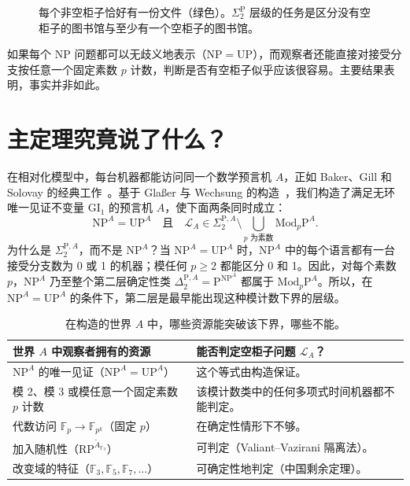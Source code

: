 \documentclass[11pt,a4paper]{article}
\newcommand{\F}{\mathbb F}
\newcommand{\NP}{\mathrm{NP}}
\newcommand{\UP}{\mathrm{UP}}
\newcommand{\MP}[1]{\mathrm{Mod}_{#1}\mathrm P}
\newcommand{\LA}{\mathcal L_A}
\newcommand{\GI}{\mathrm{GI}_1}
\newcommand{\Sig}{\Sigma_2^{\mathrm P,A}}
\begin{document}
\begin{figure}[htbp]\centering
{}
\caption{每个非空柜子恰好有一份文件（绿色）。$\Sigma_2^{\mathrm P}$ 层级的任务是区分没有空柜子的图书馆与至少有一个空柜子的图书馆。}
\end{figure}

如果每个 $\NP$ 问题都可以无歧义地表示（$\NP=\UP$），而观察者还能直接对接受分支按任意一个固定素数 $p$ 计数，判断是否有空柜子似乎应该很容易。主要结果表明，事实并非如此。

\section{主定理究竟说了什么？}
在相对化模型中，每台机器都能访问同一个数学预言机 $A$，正如 Baker、Gill 和 Solovay 的经典工作~\cite{bgs}。基于 Glaßer 与 Wechsung 的构造~\cite{gw}，我们构造了满足无环唯一见证不变量 $\GI$ 的预言机 $A$，使下面两条同时成立：
\[
 \NP^A=\UP^A\quad\text{且}\quad
 \LA\in\Sig\setminus\bigcup_{p\text{ 为素数}}\MP p^A .
\]
为什么是 $\Sig$，而不是 $\NP^A$？当 $\NP^A=\UP^A$ 时，$\NP^A$ 中的每个语言都有一台接受分支数为 0 或 1 的机器；模任何 $p\ge2$ 都能区分 0 和 1。因此，对每个素数 $p$，$\NP^A$ 乃至整个第二层确定性类 $\Delta_2^{\mathrm P,A}=\mathrm P^{\NP^A}$ 都属于 $\MP p^A$。所以，在 $\NP^A=\UP^A$ 的条件下，第二层是最早能出现这种模计数下界的层级。

\begin{table}[htbp]\small\centering
\begin{tabularx}{\linewidth}{@{}>{\raggedright\arraybackslash}p{.47\linewidth} >{\raggedright\arraybackslash}X@{}}
\toprule 世界 $A$ 中观察者拥有的资源 & 能否判定空柜子问题 $\LA$？\\
\midrule $\NP^A$ 的唯一见证（$\NP^A=\UP^A$） & 这个等式由构造保证。\\
模 2、模 3 或模任意一个固定素数 $p$ 计数 & 该模计数类中的任何多项式时间机器都不能判定。\\
代数访问 $\F_p\to\F_{p^k}$（固定 $p$） & 在确定性情形下不够。\\
加入随机性（$\mathrm{RP}^{\widetilde A_{\F_3}}$） & 可判定（Valiant--Vazirani 隔离法）。\\
改变域的特征（$\F_3,\F_5,\F_7,\ldots$） & 可确定性地判定（中国剩余定理）。\\
\bottomrule
\end{tabularx}
\caption{在构造的世界 $A$ 中，哪些资源能突破该下界，哪些不能。}
\end{table}
\end{document}
